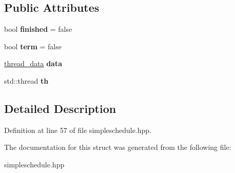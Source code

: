 \subsection*{Public Attributes}
\begin{DoxyCompactItemize}
\item 
\hypertarget{structsimple__schedule_1_1thread__info__t_a4356505e8a1a9acda6bfa2f90aa9f04f}{}\label{structsimple__schedule_1_1thread__info__t_a4356505e8a1a9acda6bfa2f90aa9f04f} 
bool {\bfseries finished} = false
\item 
\hypertarget{structsimple__schedule_1_1thread__info__t_afb3e956152bae0b26920ec322af3fa26}{}\label{structsimple__schedule_1_1thread__info__t_afb3e956152bae0b26920ec322af3fa26} 
bool {\bfseries term} = false
\item 
\hypertarget{structsimple__schedule_1_1thread__info__t_a63e629fbd30e78f987f48c9283863ea0}{}\label{structsimple__schedule_1_1thread__info__t_a63e629fbd30e78f987f48c9283863ea0} 
\hyperlink{structsimple__schedule_1_1thread__data}{thread\+\_\+data} {\bfseries data}
\item 
\hypertarget{structsimple__schedule_1_1thread__info__t_a6e9c78d9b2379b795d220eba32c708cc}{}\label{structsimple__schedule_1_1thread__info__t_a6e9c78d9b2379b795d220eba32c708cc} 
std\+::thread {\bfseries th}
\end{DoxyCompactItemize}


\subsection{Detailed Description}


Definition at line 57 of file simpleschedule.\+hpp.



The documentation for this struct was generated from the following file\+:\begin{DoxyCompactItemize}
\item 
simpleschedule.\+hpp\end{DoxyCompactItemize}
